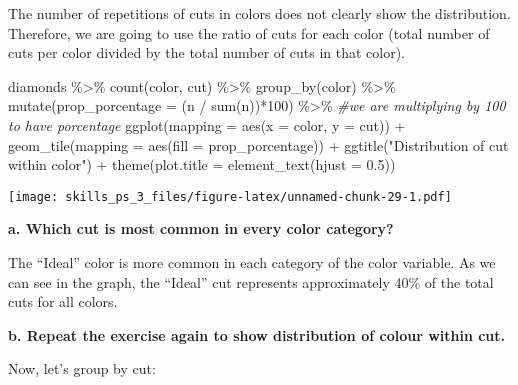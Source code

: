 \documentclass[
]{article}
\newenvironment{Shaded}{\begin{snugshade}}{\end{snugshade}}
\newcommand{\AttributeTok}[1]{\textcolor[rgb]{0.77,0.63,0.00}{#1}}
\newcommand{\CommentTok}[1]{\textcolor[rgb]{0.56,0.35,0.01}{\textit{#1}}}
\newcommand{\DecValTok}[1]{\textcolor[rgb]{0.00,0.00,0.81}{#1}}
\newcommand{\FloatTok}[1]{\textcolor[rgb]{0.00,0.00,0.81}{#1}}
\newcommand{\FunctionTok}[1]{\textcolor[rgb]{0.00,0.00,0.00}{#1}}
\newcommand{\NormalTok}[1]{#1}
\newcommand{\SpecialCharTok}[1]{\textcolor[rgb]{0.00,0.00,0.00}{#1}}
\newcommand{\StringTok}[1]{\textcolor[rgb]{0.31,0.60,0.02}{#1}}
\begin{document}
The number of repetitions of cuts in colors does not clearly show the
distribution. Therefore, we are going to use the ratio of cuts for each
color (total number of cuts per color divided by the total number of
cuts in that color).

\begin{Shaded}
\begin{Highlighting}[]
\NormalTok{diamonds }\SpecialCharTok{\%\textgreater{}\%}
  \FunctionTok{count}\NormalTok{(color, cut) }\SpecialCharTok{\%\textgreater{}\%}
  \FunctionTok{group\_by}\NormalTok{(color) }\SpecialCharTok{\%\textgreater{}\%}
  \FunctionTok{mutate}\NormalTok{(}\AttributeTok{prop\_porcentage =}\NormalTok{ (n }\SpecialCharTok{/} \FunctionTok{sum}\NormalTok{(n))}\SpecialCharTok{*}\DecValTok{100}\NormalTok{) }\SpecialCharTok{\%\textgreater{}\%} \CommentTok{\#we are multiplying by 100 to have porcentage}
  \FunctionTok{ggplot}\NormalTok{(}\AttributeTok{mapping =} \FunctionTok{aes}\NormalTok{(}\AttributeTok{x =}\NormalTok{ color, }\AttributeTok{y =}\NormalTok{ cut)) }\SpecialCharTok{+}
  \FunctionTok{geom\_tile}\NormalTok{(}\AttributeTok{mapping =} \FunctionTok{aes}\NormalTok{(}\AttributeTok{fill =}\NormalTok{ prop\_porcentage)) }\SpecialCharTok{+}
  \FunctionTok{ggtitle}\NormalTok{(}\StringTok{"Distribution of cut within color"}\NormalTok{) }\SpecialCharTok{+}
  \FunctionTok{theme}\NormalTok{(}\AttributeTok{plot.title =} \FunctionTok{element\_text}\NormalTok{(}\AttributeTok{hjust =} \FloatTok{0.5}\NormalTok{))}
\end{Highlighting}
\end{Shaded}

\texttt{[image: skills\_ps\_3\_files/figure-latex/unnamed-chunk-29-1.pdf]}

\textbf{a. Which cut is most common in every color category?}

The ``Ideal'' color is more common in each category of the color
variable. As we can see in the graph, the ``Ideal'' cut represents
approximately 40\% of the total cuts for all colors.

\textbf{b. Repeat the exercise again to show distribution of colour
within cut.}

Now, let's group by cut:
\end{document}
